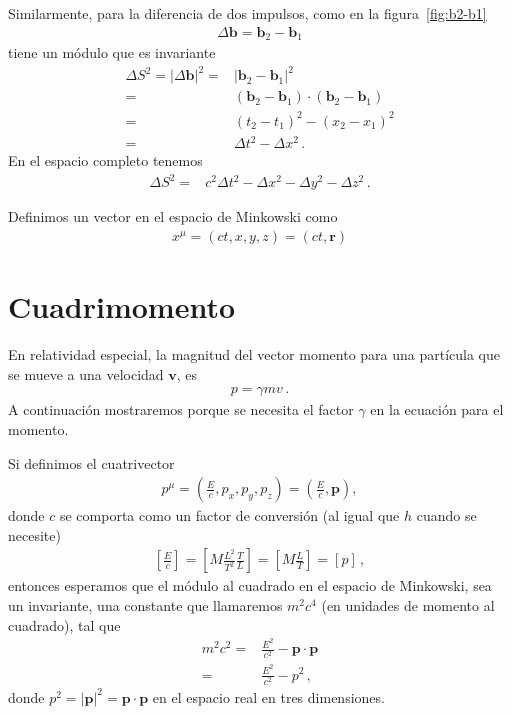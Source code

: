 \documentclass[11pt,a4paper]{article}
\begin{document}
Similarmente, para la diferencia de dos impulsos, como en la figura~\ref{fig:b2-b1}
\begin{align*}
    \Delta\boldsymbol{b} = \boldsymbol{b}_2 - \boldsymbol{b}_1 
\end{align*}
tiene un módulo que es invariante
\begin{align*}
    \Delta S^2 = |\Delta\boldsymbol{b}|^2=& |\boldsymbol{b}_2 -\boldsymbol{b}_1 |^2\\
    =&(\boldsymbol{b}_2 -\boldsymbol{b}_1)\cdot (\boldsymbol{b}_2 -\boldsymbol{b}_1)  \\
=&\left(t_2-t_1\right)^2 -\left(x_2-x_1\right)^2\\
    = &\Delta t^2 - \Delta x^2\,. 
\end{align*}
En el espacio completo tenemos
\begin{align*}
    \Delta S^2 =
     &c^2\Delta t^2 - \Delta x^2 - \Delta y^2 - \Delta z^2\,. 
\end{align*}

Definimos un vector en el espacio de Minkowski como
\begin{align*}
    x^\mu = (ct,x,y,z) = (ct,\boldsymbol{r})
\end{align*}

\section{Cuadrimomento}
En relatividad especial, la magnitud del vector momento para una partícula que se mueve a una velocidad $\boldsymbol{v}$, es
\begin{align*}
    p= \gamma m v\,.
\end{align*}
A continuación mostraremos porque se necesita el factor $\gamma$ en la ecuación para el momento. 

Si definimos el cuatrivector
\begin{align*}
    p^\mu = \left(\frac{E}{c},p_x,p_y,p_z\right) = \left(\frac{E}{c},\boldsymbol{p}\right),
\end{align*}
donde $c$ se comporta como un factor de conversión (al igual que $h$ cuando se necesite)
\begin{align*}
    \left[\frac{E}{c}\right] = \left[ M\frac{L^2}{T^2}\frac{T}{L}  \right] = \left[M \frac{L}{T}\right] = [p]\,,
\end{align*}
entonces esperamos que el módulo al cuadrado en el espacio de Minkowski, sea un invariante, una constante que llamaremos $m^2 c^4$ (en unidades de momento al cuadrado), tal que
\begin{align*}
    m^2 c^2 =& \frac{E^2}{c^2} - \boldsymbol{p}\cdot\boldsymbol{p} \\
        =&   \frac{E^2}{c^2} -p^2\,,
\end{align*}
donde $p^2 = |\boldsymbol{p}|^2 =\boldsymbol{p}\cdot\boldsymbol{p} $ en el espacio real en tres dimensiones.
\end{document}
